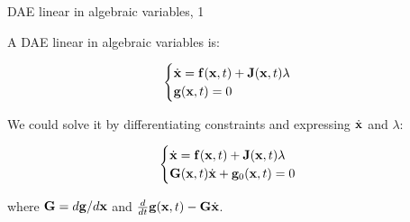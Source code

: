 \documentclass{beamer}
\begin{document}
\begin{frame}{DAE linear in algebraic variables, 1}
	\begin{flushleft}
		
		A DAE linear in algebraic variables is:
		
		\begin{equation}
			\begin{cases}
				\dot{\mathbf{x}} = \mathbf{f}(\mathbf{x}, t) + \mathbf{J}(\mathbf{x}, t) \lambda \\
				\mathbf{g}(\mathbf{x}, t) = 0
			\end{cases}
		\end{equation}
		
		We could solve it by differentiating constraints and expressing $\dot{\mathbf{x}}$ and $\lambda$:
		
		\begin{equation}
		\begin{cases}
			\dot{\mathbf{x}} = \mathbf{f}(\mathbf{x}, t) + \mathbf{J}(\mathbf{x}, t) \lambda \\
			\mathbf{G}(\mathbf{x}, t)\dot{\mathbf{x}} + \mathbf{g}_0(\mathbf{x}, t)  = 0
		\end{cases}
		\end{equation}
	
		where $\mathbf{G} = d\mathbf{g} / d\mathbf{x}$ and $\frac{d}{dt} \mathbf{g}(\mathbf{x}, t) - \mathbf{G}\dot{\mathbf{x}}$.
		
	\end{flushleft}
\end{frame}
\end{document}
